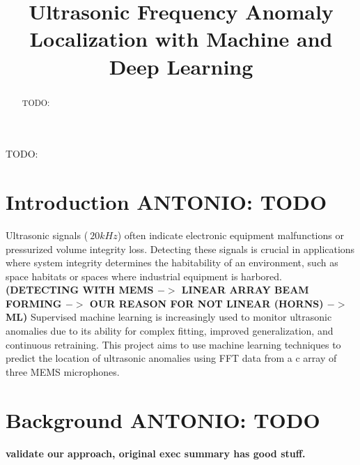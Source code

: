 \documentclass[conference]{IEEEtran}
\begin{document}
\title{Ultrasonic Frequency Anomaly Localization with Machine and Deep Learning\\}

\author{
\and
{}
\and
{}
}
\maketitle
\begin{abstract}
TODO:
\end{abstract}
\begin{IEEEkeywords}
TODO:
\end{IEEEkeywords}
\section{Introduction \textbf{ANTONIO: TODO}}
Ultrasonic signals ($\>20 kHz$) often indicate electronic equipment malfunctions or pressurized volume integrity loss. Detecting these signals is crucial in applications where system integrity determines the habitability of an environment, such as space habitats or spaces where industrial equipment is harbored. \textbf{(DETECTING WITH MEMS $->$ LINEAR ARRAY BEAM FORMING $->$ OUR REASON FOR NOT LINEAR (HORNS) $->$ ML)} Supervised machine learning is increasingly used to monitor ultrasonic anomalies due to its ability for complex fitting, improved generalization, and continuous retraining. This project aims to use machine learning techniques to predict the location of ultrasonic anomalies using FFT data from a c array of three MEMS microphones.
\section{Background \textbf{ANTONIO: TODO}}
\textbf{validate our approach, original exec summary has good stuff.}
\end{document}
